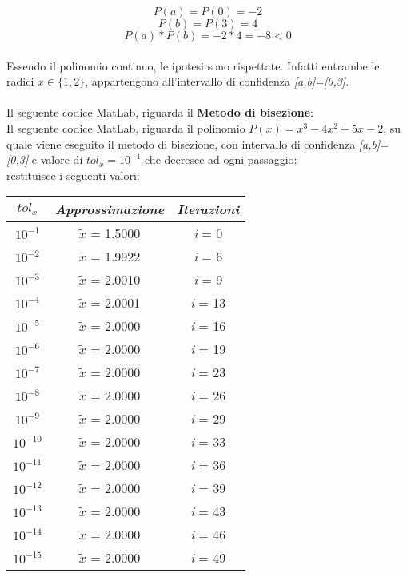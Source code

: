 	\[
	P(a) = P(0) = -2
	\]
	\[
	P(b) = P(3) = 4
	\]
	\[
	P(a)*P(b) = -2 * 4 = -8 < 0
	\]\\
Essendo il polinomio continuo, le ipotesi sono rispettate. Infatti entrambe le radici $x \in \{1,2\}$, appartengono all'intervallo di confidenza \textit{[a,b]=[0,3]}.\\\\
Il seguente codice MatLab, riguarda il \textbf{Metodo di bisezione}:\\
	
Il seguente codice MatLab, riguarda il polinomio $P(x) = x^3-4x^2+5x-2$, su quale viene eseguito il metodo di bisezione, con intervallo di confidenza \textit{[a,b]=[0,3]} e valore di $tol_x=10^{-1}$ che decresce ad ogni passaggio:\\
	
restituisce i seguenti valori:\\
\begin{center}
	\begin{tabular}{|c|c|c|}
		\hline
			$tol_x$ & \textit{Approssimazione} & \textit{Iterazioni} \\
		\hline
   			$10^{-1}$ & $\tilde{x}$ = 1.5000 & \textit{i} = 0\\
    		$10^{-2}$ & $\tilde{x}$ = 1.9922 & \textit{i} = 6\\
    		$10^{-3}$ & $\tilde{x}$ = 2.0010 & \textit{i} = 9\\
    		$10^{-4}$ & $\tilde{x}$ = 2.0001 & \textit{i} = 13\\
   			$10^{-5}$ & $\tilde{x}$ = 2.0000 & \textit{i} = 16\\
   			$10^{-6}$ & $\tilde{x}$ = 2.0000 & \textit{i} = 19\\
    		$10^{-7}$ & $\tilde{x}$ = 2.0000 & \textit{i} = 23\\
    		$10^{-8}$ & $\tilde{x}$ = 2.0000 & \textit{i} = 26\\
    		$10^{-9}$ & $\tilde{x}$ = 2.0000 & \textit{i} = 29\\
    		$10^{-10}$ & $\tilde{x}$ = 2.0000 & \textit{i} = 33\\
    		$10^{-11}$ & $\tilde{x}$ = 2.0000 & \textit{i} = 36\\
    		$10^{-12}$ & $\tilde{x}$ = 2.0000 & \textit{i} = 39\\
    		$10^{-13}$ & $\tilde{x}$ = 2.0000 & \textit{i} = 43\\
    		$10^{-14}$ & $\tilde{x}$ = 2.0000 & \textit{i} = 46\\
    		$10^{-15}$ & $\tilde{x}$ = 2.0000 & \textit{i} = 49\\
		\hline
	\end{tabular}
\end{center}
